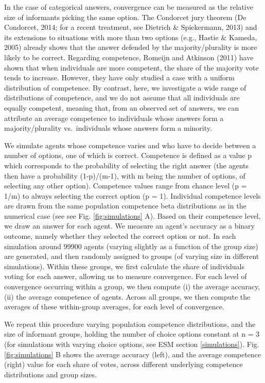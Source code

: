 \documentclass[
  doc,floatsintext]{apa6}
\begin{document}
In the case of categorical answers, convergence can be measured as the relative size of informants picking the same option. The Condorcet jury theorem (De Condorcet, 2014; for a recent treatment, see Dietrich \& Spiekermann, 2013) and its extensions to situations with more than two options (e.g., Hastie \& Kameda, 2005) already shows that the answer defended by the majority/plurality is more likely to be correct. Regarding competence, Romeijn and Atkinson (2011) have shown that when individuals are more competent, the share of the majority vote tends to increase. However, they have only studied a case with a uniform distribution of competence. By contrast, here, we investigate a wide range of distributions of competence, and we do not assume that all individuals are equally competent, meaning that, from an observed set of answers, we can attribute an average competence to individuals whose answers form a majority/plurality vs.~individuals whose answers form a minority.

We simulate agents whose competence varies and who have to decide between a number of options, one of which is correct. Competence is defined as a value p which corresponds to the probability of selecting the right answer (the agents then have a probability (1-p)/(m-1), with m being the number of options, of selecting any other option). Competence values range from chance level (p = 1/m) to always selecting the correct option (p = 1). Individual competence levels are drawn from the same population competence beta distributions as in the numerical case (see see Fig. \ref{fig:simulations} A). Based on their competence level, we draw an answer for each agent. We measure an agent's accuracy as a binary outcome, namely whether they selected the correct option or not. In each simulation around 99900 agents (varying slightly as a function of the group size) are generated, and then randomly assigned to groups (of varying size in different simulations). Within these groups, we first calculate the share of individuals voting for each answer, allowing us to measure convergence. For each level of convergence occurring within a group, we then compute (i) the average accuracy, (ii) the average competence of agents. Across all groups, we then compute the averages of these within-group averages, for each level of convergence.

We repeat this procedure varying population competence distributions, and the size of informant groups, holding the number of choice options constant at n = 3 (for simulations with varying choice options, see ESM section \ref{simulations}). Fig. \ref{fig:simulations} B shows the average accuracy (left), and the average competence (right) value for each share of votes, across different underlying competence distributions and group sizes.
\end{document}
